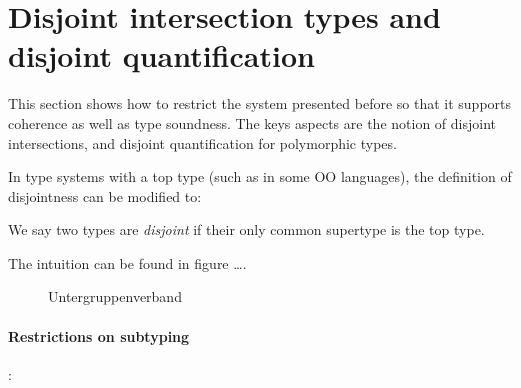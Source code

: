 \section{Disjoint intersection types and disjoint quantification}

This section shows how to restrict the system presented before
so that it supports coherence as well as type soundness.
The keys aspects are the notion of disjoint intersections,
and disjoint quantification for polymorphic types.

In type systems with a top type (such as \lstinline@Object@ in some OO languages), the definition of disjointness can be modified to:

We say two types are \emph{disjoint} if their only common supertype is the top type.

The intuition can be found in figure \ldots.

\begin{figure}

\centering
\newcommand{\mydistance}{.6cm}
\caption{Untergruppenverband}
\end{figure}

\paragraph{Restrictions on subtyping}:


